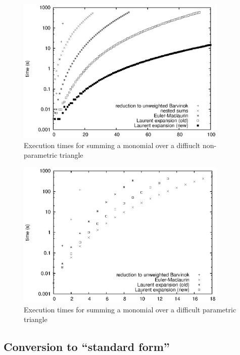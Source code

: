 \begin{figure}
\includegraphics[width=0.9\textwidth]{sum}
\caption{Execution times for summing a monomial over a diffiuclt
non-parametric triangle}
\label{f:sum}
\end{figure}

\begin{figure}
\includegraphics[width=0.9\textwidth]{sum_p}
\caption{Execution times for summing a monomial over a difficult
parametric triangle}
\label{f:sum:p}
\end{figure}

\subsection{Conversion to ``standard form''}
\label{s:standard}


